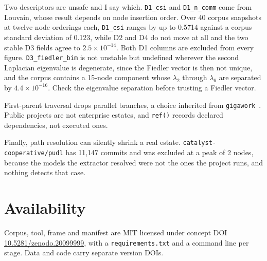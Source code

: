 \documentclass[10pt,conference]{IEEEtran}
\begin{document}
Two descriptors are unsafe and I say which. \texttt{D1\_csi} and
\texttt{D1\_n\_comm} come from Louvain, whose result depends on node insertion
order. Over 40 corpus snapshots at twelve node orderings each, \texttt{D1\_csi}
ranges by up to 0.5714 against a corpus standard deviation of 0.123, while D2
and D4 do not move at all and the two stable D3 fields agree to
$2.5\times10^{-14}$. Both D1 columns are excluded from every figure. \texttt{D3\_fiedler\_bim} is not unstable but
undefined wherever the second Laplacian eigenvalue is degenerate, since the
Fiedler vector is then not unique, and the corpus contains a 15-node component
whose $\lambda_2$ through $\lambda_6$ are separated by $4.4\times10^{-16}$.
Check the eigenvalue separation before trusting a Fiedler vector.

First-parent traversal drops parallel branches, a choice inherited from
\texttt{gigawork}~\cite{cardoen2024}. Public projects are not enterprise
estates, and \texttt{ref()} records declared dependencies, not executed ones.

Finally, path resolution can silently shrink a real estate.
\texttt{catalyst-cooperative/pudl} has 11{,}147 commits and was excluded at a
peak of 2 nodes, because the models the extractor resolved were not the ones the
project runs, and nothing detects that case.

\section{Availability}

Corpus, tool, frame and manifest are MIT licensed under concept DOI
\href{https://doi.org/10.5281/zenodo.20099999}{10.5281/zenodo.20099999}, with a
\texttt{requirements.txt} and a command line per stage. Data and code carry
separate version DOIs.

\balance
\end{document}
